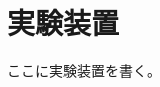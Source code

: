 \documentclass[12pt,a4paper,oneside,onecolumn,fleqn,dvipdfmx]{jreport}
\begin{document}
    \chapter{実験装置}
        ここに実験装置を書く。
\end{document}

